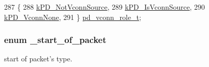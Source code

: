 \begin{DoxyCode}
287 \{
288     \hyperlink{group__usb__pd__stack_ggab67908aebf6cb10704f4ec6127761e28ad27a489c262689fb72562c3a59cb9727}{kPD\_NotVconnSource}, 
289     \hyperlink{group__usb__pd__stack_ggab67908aebf6cb10704f4ec6127761e28a239cd9fcbe39abba0bc8959dc1a24e37}{kPD\_IsVconnSource},  
290     \hyperlink{group__usb__pd__stack_ggab67908aebf6cb10704f4ec6127761e28ae0360c02ff4cf3244238399eab41ff6d}{kPD\_VconnNone},      
291 \} \hyperlink{group__usb__pd__stack_ga1e7a5e660ff0837fe23286556a20d4eb}{pd\_vconn\_role\_t};
\end{DoxyCode}
\hypertarget{group__usb__pd__stack_ga7a924235403e0acab44d01e720091aa1}{
\subsubsection[{\-\_\-start\-\_\-of\-\_\-packet}]{\setlength{\rightskip}{0pt plus 5cm}enum {\bf \-\_\-start\-\_\-of\-\_\-packet}}}\label{group__usb__pd__stack_ga7a924235403e0acab44d01e720091aa1}


start of packet's type. 

